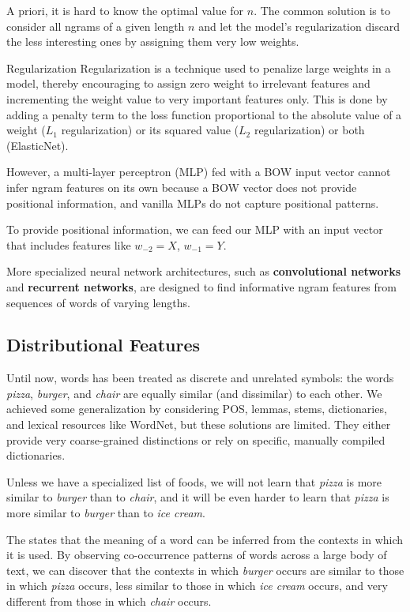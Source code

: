 A priori, it is hard to know the optimal value for $n$. The common solution is to consider all ngrams of a given length \(n\) and let the model's regularization discard the less interesting ones by assigning them very low weights.

\begin{note}{Regularization}
    Regularization is a technique used to penalize large weights in a model, thereby encouraging to assign zero weight to irrelevant features and incrementing the weight value to very important features only.
    This is done by adding a penalty term to the loss function proportional to the absolute value of a weight (\(L_1\) regularization) or its squared value (\(L_2\) regularization) or both (ElasticNet).
\end{note}

However, a multi-layer perceptron (MLP) fed with a BOW input vector cannot infer ngram features on its own because a BOW vector does not provide positional information, and vanilla MLPs do not capture positional patterns.

To provide positional information, we can feed our MLP with an input vector that includes features like $w_{-2}=X$, $w_{-1}=Y$.

More specialized neural network architectures, such as \textbf{convolutional networks} and \textbf{recurrent networks}, are designed to find informative ngram features from sequences of words of varying lengths.

\subsection{Distributional Features}
Until now, words has been treated as discrete and unrelated symbols: the words \textit{pizza}, \textit{burger}, and \textit{chair} are equally similar (and dissimilar) to each other. We achieved some generalization by considering POS, lemmas, stems, dictionaries, and lexical resources like WordNet, but these solutions are limited. They either provide very coarse-grained distinctions or rely on specific, manually compiled dictionaries.

Unless we have a specialized list of foods, we will not learn that \textit{pizza} is more similar to \textit{burger} than to \textit{chair}, and it will be even harder to learn that \textit{pizza} is more similar to \textit{burger} than to \textit{ice cream}.

The  states that the meaning of a word can be inferred from the contexts in which it is used. By observing co-occurrence patterns of words across a large body of text, we can discover that the contexts in which \textit{burger} occurs are similar to those in which \textit{pizza} occurs, less similar to those in which \textit{ice cream} occurs, and very different from those in which \textit{chair} occurs.

